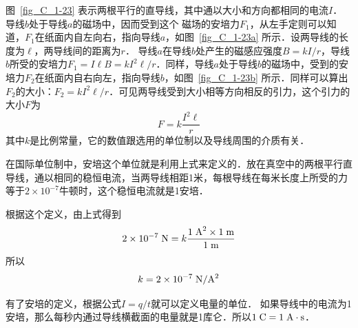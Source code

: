 图~\ref{fig_C_1-23} 表示两根平行的直导线，其中通以大小和方向都相同的电流$I$．
导线$b$处于导线$a$的磁场中，因而受到这个
磁场的安培力$F_1$，从左手定则可以知道，$F_1$在纸面内自左向右，指向导线$a$，如图~\ref{fig_C_1-23a} 所示．设两导线的长度为$\ell$，两导线间的距离为$r$．
导线$a$在导线$b$处产生的磁感应强度$B=kI/r$，导线$b$所受的安培力$F_1=I\ell B=kI^2\ell/r$．同样，导线$a$处于导线$b$的磁场中，受到的安培力$F_2$在纸面内自右向左，指向导线$b$，如图~\ref{fig_C_1-23b} 所示．同样可以算出$F_2$的大小：$F_2=kI^2\ell/r$．可见两导线受到大小相等方向相反的引力，这个引力的大小$F$为
\[F=k\frac{I^2\ell}{r}\]
其中$k$是比例常量，它的数值跟选用的单位制以及导线周围的介质有关．

在国际单位制中，安培这个单位就是利用上式来定义的．放在真空中的两根平行直导线，通以相同的稳恒电流，当两导线相距1米，每根导线在每米长度上所受的力等于$2\times10^{-7}$牛顿时，这个稳恒电流就是1安培．

根据这个定义，由上式得到
\[ 2\times10^{-7} \;\text{N} =k\frac{1 \;\text{A}^2 \times 1  \;\text{m} }{1\;\text{m}}\]
所以
\[k=2\times10^{-7}  \;\text{N}/\text{A}^2 \]

有了安培的定义，根据公式$I=q/t$就可以定义电量的单位．
如果导线中的电流为1安培，那么每秒内通过导线横截面的电量就是1库仑．所以$1 \;\text{C} =1 \;\text{A}\cdot\text{s} $．

